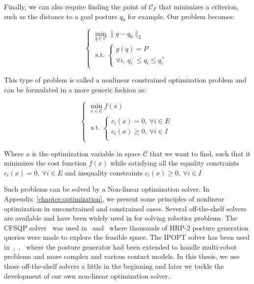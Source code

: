 Finally, we can also require finding the point of $\mathcal{C}_F$ that minimizes a criterion, such as the distance to a goal posture $q_0$ for example.
Our problem becomes:

\begin{equation}
  \left\{
  \begin{array}{l}
    \min\limits_{q\in\mathcal{C}}{\|q-q_0\|_2}\\
    \text{ s.t. }
    \left\{
    \begin{array}{l}
      g(q)=P\\
      \forall i,\ q_i^- \leq q_i \leq q_i^+
    \end{array}
    \right.
  \end{array}
  \right.
\end{equation}

This type of problem is called a nonlinear constrained optimization problem and can be formulated in a more generic fashion as:

\begin{equation}
\label{eq:optim_form_PG}
  \left\{
  \begin{array}{l}
    \min\limits_{x\in\mathcal{C}}{f(x)}\\
    \text{ s.t. }
    \left\{
    \begin{array}{l}
      c_i(x) = 0,\ \forall i\in{E}\\
      c_i(x) \geq 0,\ \forall i\in{I}\\
    \end{array}
    \right.
  \end{array}
  \right.
\end{equation}

Where $x$ is the optimization variable in space $\mathcal{C}$ that we want to find, such that it minimizes the cost function $f(x)$ while satisfying all the equality constraints $c_i(x) = 0,\ \forall i\in{E}$ and inequality constraints $c_i(x) \geq 0,\ \forall i\in{I}$

Such problems can be solved by a Non-linear optimization solver.
In Appendix~\ref{chapter:optimization}, we present some principles of nonlinear optimization in unconstrained and constrained cases.
Several off-the-shelf solvers are available and have been widely used in for solving robotics problems.
The CFSQP solver~\cite{cfsqp:manual} was used in~\cite{escande:iros:2009} and~\cite{escande:ras:2013} where thousands of HRP-2 posture generation queries were made to explore the feasible space.
The IPOPT solver has been used in~\cite{vaillant:humanoids:2014},~\cite{vaillant:autonomousrobots:2016},~\cite{bouyarmane:ar:2012} where the posture generator had been extended to handle multi-robot problems and more complex and various contact models.
In this thesis, we use those off-the-shelf solvers a little in the beginning and later we tackle the development of our own non-linear optimization solver.


